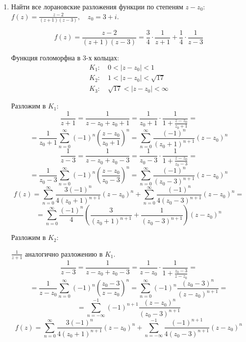 \documentclass[14pt, a4paper, titlepage, fleqn]{extarticle}
\begin{document}
\begin{enumerate}
        
        \item Найти все лорановские разложения функции по степеням \( z - z_0 \): \( \displaystyle f(z) = \frac{z-2}{(z+1)(z-3)}, \quad z_0 = 3+i \).  
        
        \[
            f(z) = \frac{z-2}{(z+1)(z-3)} = \frac{3}{4} \cdot \frac{1}{z+1} + \frac{1}{4} \cdot \frac{1}{z-3}
        \]

        Функция голоморфна в 3-х кольцах:
        \[
            \begin{aligned}
                K_1:&~ 0<|z-z_0|<1 \\
                K_2:&~ 1 < |z-z_0|<\sqrt{17} \\
                K_3:&~ \sqrt{17}<|z-z_0|<\infty
            \end{aligned}
        \]
        
        Разложим в \( K_1 \):
        \[
            \frac{1}{z+1} = \frac{1}{z - z_0 + z_0+1 } = \frac{1}{z_0+1} \cdot \frac{1}{1+\frac{z-z_0}{z_0+1}} =
        \]
        \[
            = \frac{1}{z_0+1} \sum_{n=0}^{\infty} (-1)^n \left(\frac{z-z_0}{z_0+1} \right)^n = \sum_{n=0}^{\infty} \frac{ (-1)^n }{(z_0+1)^{n+1}} (z-z_0)^n
        \]
        \[
            \frac{1}{z-3} = \frac{1}{z- z_0 + z_0 - 3} = \frac{1}{z_0-3} \cdot \frac{1}{1+\frac{z-z_0}{z_0-3}} =
        \]
        \[
            = \frac{1}{z_0-3} \sum_{n=0}^{\infty} (-1)^n \left( \frac{z-z_0}{z_0-3} \right)^n = \sum_{n=0}^{\infty} \frac{(-1)^n}{(z_0-3)^{n+1}} (z-z_0)^n
        \]
        \[
            f(z) = \sum_{n=0}^{\infty} \frac{ 3(-1)^n }{4(z_0+1)^{n+1}} (z-z_0)^n + \sum_{n=0}^{\infty} \frac{(-1)^n}{4(z_0-3)^{n+1}} (z-z_0)^n =
        \]
        \[
            = \sum_{n=0}^{\infty} \frac{(-1)^n}{4} \left( \frac{3}{(z_0+1)^{n+1}} + \frac{1}{(z_0-3)^{n+1}} \right) (z-z_0)^n
        \]

        \pagebreak

        Разложим в \( K_2 \):

        \( \displaystyle \frac{1}{z+1} \) аналогично разложению в \( K_1 \).
        \[
            \frac{1}{z-3} = \frac{1}{z- z_0 + z_0 - 3} = \frac{1}{z-z_0} \cdot \frac{1}{1 + \frac{z_0-3}{z-z_0}} =
        \]
        \[
            = \frac{1}{z-z_0} \sum_{n=0}^{\infty} (-1)^n \left( \frac{z_0-3}{z-z_0} \right)^n = \sum_{n=0}^{\infty} (-1)^n \frac{(z_0-3)^n}{(z-z_0)^{n+1}} =
        \]
        \[
            = \sum_{n=-\infty}^{-1} (-1)^{n+1} \frac{(z-z_0)^n}{(z_0-3)^{n+1}}
        \]
        \[
            f(z) = \sum_{n=0}^{\infty} \frac{ 3(-1)^n }{4(z_0+1)^{n+1}} (z-z_0)^n + \sum_{n=-\infty}^{-1} \frac{(-1)^{n+1}}{4(z_0-3)^{n+1}} (z-z_0)^n
        \]


\end{enumerate}
\end{document}

